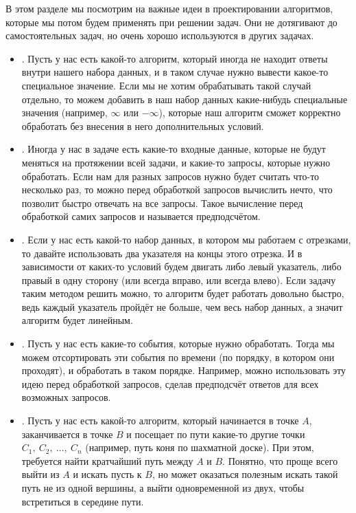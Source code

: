 В этом разделе мы посмотрим на важные идеи в проектировании алгоритмов, которые мы потом будем применять при решении задач. Они не дотягивают до самостоятельных задач, но очень хорошо используются в других задачах.

\begin{itemize}
    \item {}. Пусть у нас есть какой-то алгоритм, который иногда не находит ответы внутри нашего набора данных, и в таком случае нужно вывести какое-то специальное значение. Если мы не хотим обрабатывать такой случай отдельно, то можем добавить в наш набор данных какие-нибудь специальные значения (например, $\infty$ или $-\infty$), которые наш алгоритм сможет корректно обработать без внесения в него дополнительных условий.
    \item {}. Иногда у нас в задаче есть какие-то входные данные, которые не будут меняться на протяжении всей задачи, и какие-то запросы, которые нужно обработать. Если нам для разных запросов нужно будет считать что-то несколько раз, то можно перед обработкой запросов вычислить нечто, что позволит быстро отвечать на все запросы. Такое вычисление перед обработкой самих запросов и называется предподсчётом.
    \item {}. Если у нас есть какой-то набор данных, в котором мы работаем с отрезками, то давайте использовать два указателя на концы этого отрезка. И в зависимости от каких-то условий будем двигать либо левый указатель, либо правый в одну сторону (или всегда вправо, или всегда влево). Если задачу таким методом решить можно, то алгоритм будет работать довольно быстро, ведь каждый указатель пройдёт не больше, чем весь набор данных, а значит алгоритм будет линейным.
    \item {}. Пусть у нас есть какие-то события, которые нужно обработать. Тогда мы можем отсортировать эти события по времени (по порядку, в котором они проходят), и обработать в таком порядке. Например, можно использовать эту идею перед обработкой запросов, сделав предподсчёт ответов для всех возможных запросов.
    \item {}. Пусть у нас есть какой-то алгоритм, который начинается в точке $A$, заканчивается в точке $B$ и посещает по пути какие-то другие точки $C_1,\ C_2,\ \ldots,\ C_n$ (например, путь коня по шахматной доске). При этом, требуется найти кратчайший путь между $A$ и $B$. Понятно, что проще всего выйти из $A$ и искать пусть к $B$, но может оказаться полезным искать такой путь не из одной вершины, а выйти одновременной из двух, чтобы встретиться в середине пути.

\end{itemize}
